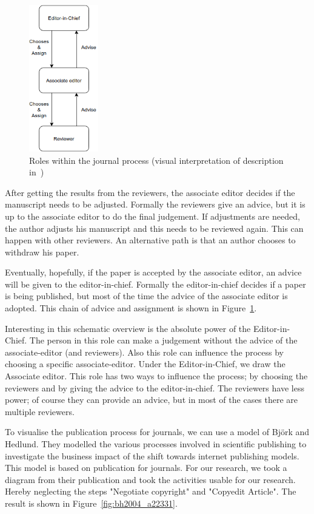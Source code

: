 \documentclass{ou-report}
\begin{document}
\begin{figure}
    \centering
    \includegraphics[width=0.27\textwidth]{images/c2013.drawio.png}
    \caption{Roles within the journal process (visual interpretation of description in~\cite{C2013})}
    \label{fig:c2013}
\end{figure}

After getting the results from the reviewers, the associate editor decides if 
the manuscript needs to be adjusted. Formally the reviewers give an advice, but 
it is up to the associate editor to do the final judgement. If adjustments are 
needed, the author adjusts his manuscript and this needs to be reviewed again. 
This can happen with other reviewers. An alternative path is that an author 
chooses to withdraw his paper.

Eventually, hopefully, if the paper is accepted by the associate editor, an 
advice will be given to the editor-in-chief. Formally the editor-in-chief 
decides if a paper is being published, but most of the time the advice of the 
associate editor is adopted. This chain of advice and assignment is shown in 
Figure~\ref{fig:c2013}. 

Interesting in this schematic overview is the absolute 
power of the Editor-in-Chief. The person in this role can make a judgement 
without the advice of the 
associate-editor (and reviewers). Also this role can influence the process by 
choosing a specific associate-editor. Under the Editor-in-Chief, we draw the 
Associate editor. This role has two ways to influence the process; by choosing 
the reviewers and by giving the advice to the editor-in-chief. The reviewers 
have less power; of course they can provide an advice, but in most of the cases 
there are multiple reviewers.

To visualise the publication process for journals, we can use a model of 
Bj\"ork and Hedlund. They modelled the various processes involved in scientific
publishing to investigate the business impact of the shift towards internet
publishing models. This model is based on publication for journals. For our 
research, we took a diagram from their publication and took the activities 
usable for our research. Hereby neglecting the steps "Negotiate copyright" and 
"Copyedit Article". The result is shown in Figure~\ref{fig:bh2004_a22331}.
\end{document}
